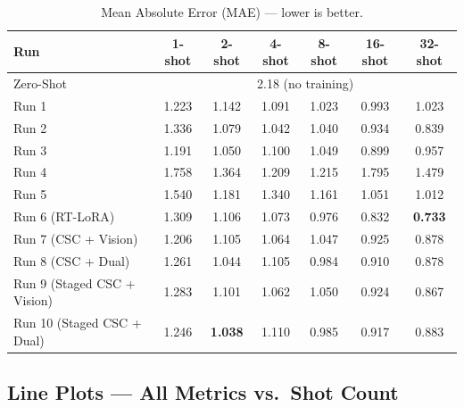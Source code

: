 \documentclass[letterpaper,11pt,leqno]{article}
\begin{document}
\begin{table}[H]
\centering
\caption{Mean Absolute Error (MAE) --- lower is better.}
\small
\begin{tabular}{lcccccc}
\toprule
\textbf{Run} & \textbf{1-shot} & \textbf{2-shot} & \textbf{4-shot}
             & \textbf{8-shot} & \textbf{16-shot} & \textbf{32-shot} \\
\midrule
Zero-Shot & \multicolumn{6}{c}{2.18 (no training)} \\
\midrule
Run 1 & 1.223 & 1.142 & 1.091 & 1.023 & 0.993 & 1.023 \\
Run 2 & 1.336 & 1.079 & 1.042 & 1.040 & 0.934 & 0.839 \\
Run 3 & \cellcolor{bestgreen}1.191 & 1.050 & 1.100 & 1.049 & 0.899 & 0.957 \\
Run 4 & \cellcolor{worstred}1.758 & \cellcolor{worstred}1.364 & \cellcolor{worstred}1.209 & \cellcolor{worstred}1.215 & \cellcolor{worstred}1.795 & \cellcolor{worstred}1.479 \\
Run 5 & 1.540 & 1.181 & 1.340 & 1.161 & 1.051 & 1.012 \\
Run 6 (RT-LoRA) & 1.309 & 1.106 & 1.073 & \cellcolor{bestgreen}0.976 & \cellcolor{bestgreen}0.832 & \cellcolor{bestgreen}\textbf{0.733} \\
Run 7 (CSC + Vision) & 1.206 & 1.105 & 1.064 & 1.047 & 0.925 & 0.878 \\
Run 8 (CSC + Dual)   & 1.261 & 1.044 & 1.105 & 0.984 & 0.910 & 0.878 \\
Run 9 (Staged CSC + Vision) & 1.283 & 1.101 & \cellcolor{bestgreen}1.062 & 1.050 & 0.924 & 0.867 \\
Run 10 (Staged CSC + Dual)  & 1.246 & \cellcolor{bestgreen}\textbf{1.038} & 1.110 & 0.985 & 0.917 & 0.883 \\
\bottomrule
\end{tabular}
\end{table}

\subsection{Line Plots --- All Metrics vs.\ Shot Count}
\end{document}
